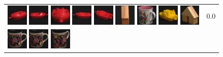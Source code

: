 \begin{figure}[tbp]
\begin{center}
\begin{tabular}{m{11cm} | m{3cm} |}
\includegraphics[width=1cm]{coil/beeld-21.eps}
\includegraphics[width=1cm]{coil/beeld-19.eps}
\includegraphics[width=1cm]{coil/beeld-20.eps}
\includegraphics[width=1cm]{coil/beeld-18.eps}
\includegraphics[width=1cm]{coil/beeld-22.eps}
\includegraphics[width=1cm]{coil/beeld-44.eps}
\includegraphics[width=1cm]{coil/beeld-10.eps}
\includegraphics[width=1cm]{coil/beeld-16.eps}
\includegraphics[width=1cm]{coil/beeld-46.eps}
& {\scriptsize 0.0}
\\
\includegraphics[width=1cm]{coil/beeld-60.eps}
\includegraphics[width=1cm]{coil/beeld-60.eps}
\includegraphics[width=1cm]{coil/beeld-63.eps}

\end{tabular}
\end{center}
\end{figure}
